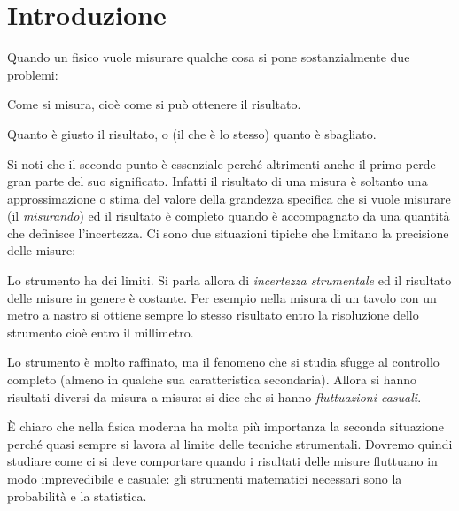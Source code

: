 \thispagestyle{empty}

\chapter*{Introduzione}

\noindent Quando un fisico vuole misurare qualche cosa si pone sostanzialmente
due problemi:
\begin{numlist}
\item Come si misura, cio\`e come si pu\`o ottenere il risultato.
\item Quanto \`e giusto il risultato, o (il che \`e lo stesso)
quanto \`e sbagliato.
\end{numlist}
Si noti che il secondo punto \`e essenziale perch\'e altrimenti
anche il primo perde gran parte del suo significato.
Infatti  il risultato di una misura \`e soltanto una approssimazione
o stima del valore della grandezza specifica che si vuole misurare
(il \emph{misurando}) ed il risultato \`e completo quando \`e accompagnato da
una quantit\`a che definisce l'incertezza.
Ci sono due situazioni tipiche che limitano la precisione delle misure:
\begin{numlist}
\item Lo strumento ha dei limiti. Si parla allora di
\emph{incertezza strumentale} ed il risultato delle misure in genere \`e
costante. Per esempio nella misura di
un tavolo con un metro a nastro si ottiene sempre lo stesso risultato entro la
risoluzione dello strumento cio\`e entro il millimetro.
\item Lo strumento \`e molto raffinato, ma il fenomeno che si studia sfugge al
controllo completo (almeno in qualche sua caratteristica secondaria).
Allora si hanno risultati diversi da misura a misura: si
dice che si hanno \emph{fluttuazioni casuali}.
\end{numlist}
\`E chiaro che nella fisica moderna ha molta pi\`u importanza la seconda
situazione perch\'e quasi
sempre si lavora al limite delle tecniche strumentali.
Dovremo quindi studiare come ci si deve comportare quando i risultati
delle misure fluttuano in modo imprevedibile e casuale: gli strumenti
matematici necessari sono la probabilit\`a e la statistica.

\clearpage
\thispagestyle{plain}
